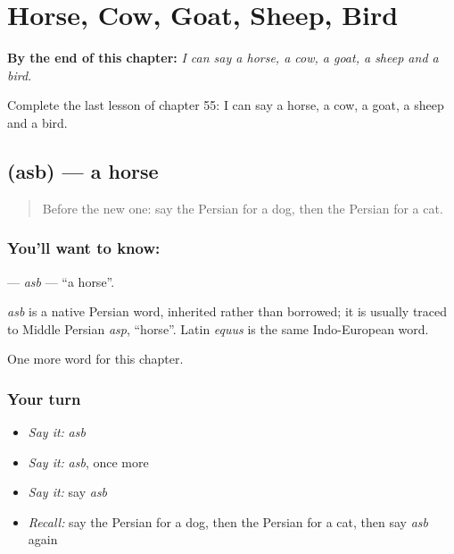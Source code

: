 
\chapter{Horse, Cow, Goat, Sheep, Bird}
\label{ch:fa-horse-cow-goat-sheep-bird}

\begin{chapteropening}
\textbf{By the end of this chapter:} \emph{I can say a horse, a cow, a goat, a sheep and a bird.}

Complete the last lesson of chapter 55: I can say a horse, a cow, a goat, a sheep and a bird.
\end{chapteropening}

\section[\texorpdfstring{\fa{اسب} (asb)}{اسب (asb)}]{ (asb) — a horse}

\label{lesson:FA-C55-asb}



\begin{quote}
Before the new one: say the Persian for a dog, then the Persian for a cat.
\end{quote}

\subsection*{You'll want to know: }
\textbf{} — \emph{asb} — \textquotedblleft{}a horse\textquotedblright{}.

\begin{cousinweb}
\emph{asb} is a native Persian word, inherited rather than borrowed; it is usually traced to Middle Persian \emph{asp}, \textquotedblleft{}horse\textquotedblright{}. Latin \emph{equus} is the same Indo-European word.
\end{cousinweb}

\begin{grammarlens}[title={What you've built}]
One more word for this chapter.
\end{grammarlens}

\subsection*{Your turn}
\begin{itemize}
\raggedright
  \item \emph{Say it:} \emph{asb}
  \item \emph{Say it:} \emph{asb}, once more
  \item \emph{Say it:} say \emph{asb}
  \item \emph{Recall:} say the Persian for a dog, then the Persian for a cat, then say \emph{asb} again
\end{itemize}

